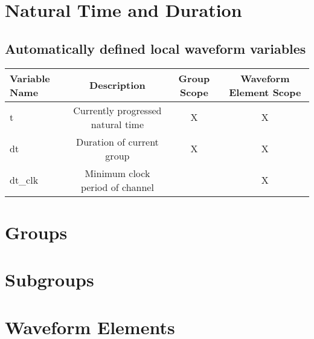 \section{Natural Time and Duration}

\subsection{Automatically defined local waveform variables}
\begin{tabular}{|l | c | c | c |}
  \hline
  Variable Name  & Description  & Group Scope & Waveform Element Scope \\
  \hline
  t     & Currently progressed natural time & X & X \\
  dt    & Duration of current group & X & X \\
 dt\_clk& Minimum clock period of channel &  & X \\
 \hline
\end{tabular}


\section{Groups}
\section{Subgroups}
\section{Waveform Elements}
